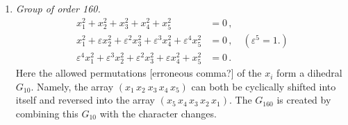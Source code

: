 \documentclass[leqno]{article}
\begin{document}
\begin{enumerate}[label=\arabic*)]
    \item \textit{Group of order 160.}
    \begin{align*}
    	x_1^2 + x_2^2 + x_3^2 + x_4^2 + x_5^2 &= 0 \, , \\
    	x_1^2 + \varepsilon x_2^2 + \varepsilon^2 x_3^2 + \varepsilon^3 x_4^2 + \varepsilon^4 x_5^2 &= 0 \, , \quad (\varepsilon^5=1.) \\
    	\varepsilon^4 x_1^2 + \varepsilon^3 x_2^2 + \varepsilon^2 x_3^2 + \varepsilon x_4^2 + x_5^2 &=0 \, . 
    \end{align*}
    Here the allowed permutations [erroneous comma?] of the $x_i$ form a dihedral $G_{10}$. Namely, the array $(x_1 \, x_2 \ x_3 \, x_4 \, x_5)$ can both be cyclically shifted into itself and reversed into the array $(x_5 \, x_4 \, x_3 \, x_2 \, x_1)$. The $G_{160}$ is created by combining this $G_{10}$ with the character changes.
\end{enumerate}

\end{document}
